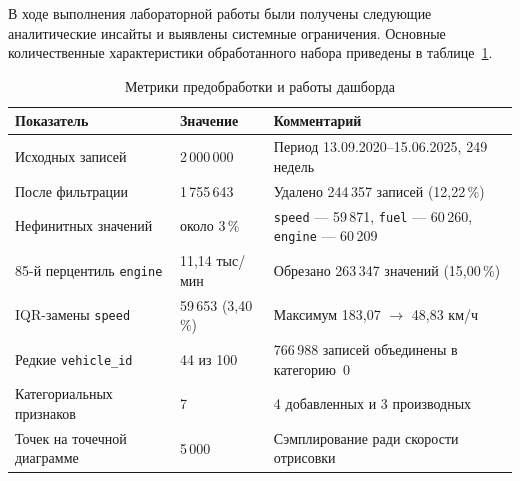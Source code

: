 \documentclass[oneside,a4paper,14pt]{extarticle}
\begin{document}
В ходе выполнения лабораторной работы были получены следующие аналитические инсайты и выявлены системные ограничения. Основные количественные характеристики обработанного набора приведены в таблице~\ref{tab:lab7metrics}.

\begin{table}[H]
	\centering
	\caption{Метрики предобработки и работы дашборда}
	\label{tab:lab7metrics}
	\renewcommand{\arraystretch}{1.2}
	\begin{tabular}{|p{5.6cm}|p{3.2cm}|p{7.2cm}|}
		\hline
		Показатель & Значение & Комментарий \\
		\hline
		Исходных записей & 2\,000\,000 & Период 13.09.2020--15.06.2025, 249 недель \\
		\hline
		После фильтрации & 1\,755\,643 & Удалено 244\,357 записей (12,22\,\%) \\
		\hline
		Нефинитных значений & около 3\,\% & \texttt{speed} --- 59\,871, \texttt{fuel} --- 60\,260, \texttt{engine} --- 60\,209 \\
		\hline
		85-й перцентиль \texttt{engine} & 11,14 тыс/мин & Обрезано 263\,347 значений (15,00\,\%) \\
		\hline
		IQR-замены \texttt{speed} & 59\,653 (3,40\,\%) & Максимум 183,07 $\to$ 48,83 км/ч \\
		\hline
		Редкие \texttt{vehicle\_id} & 44 из 100 & 766\,988 записей объединены в категорию~0 \\
		\hline
		Категориальных признаков & 7 & 4 добавленных и 3 производных \\
		\hline
		Точек на точечной диаграмме & 5\,000 & Сэмплирование ради скорости отрисовки \\
		\hline
	\end{tabular}
\end{table}
\end{document}
